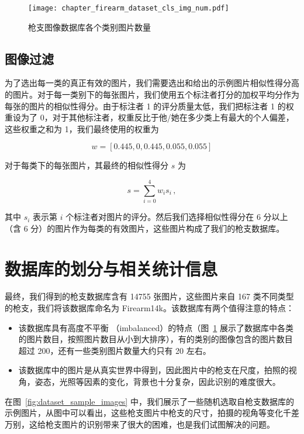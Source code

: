 \begin{figure}[t]
	\centering
	\texttt{[image: chapter\_firearm\_dataset\_cls\_img\_num.pdf]}
	\caption{枪支图像数据库各个类别图片数量}
	\label{fig:dataset_cls_img_num}
\end{figure}

\subsection{图像过滤}
为了选出每一类的真正有效的图片，我们需要选出和给出的示例图片相似性得分高的图片。对于每一类别下的每张图片，我们使用五个标注者打分的加权平均分作为每张的图片的相似性得分。由于标注者 1 的评分质量太低，我们把标注者 1 的权重设为了 0，对于其他标注者，权重反比于他/她在多少类上有最大的个人偏差，这些权重之和为 1，我们最终使用的权重为

 \[w = [0.445, 0, 0.445, 0.055, 0.055]\]

对于每类下的每张图片，其最终的相似性得分 $s$ 为

\begin{equation}
s = \sum_{i=0}^{4}w_{i}s_{i}\, ,
\end{equation}

其中 $s_i$ 表示第 $i$ 个标注者对图片的评分。然后我们选择相似性得分在 6 分以上（含 6 分）的图片作为每类的有效图片，这些图片构成了我们的枪支数据库。

\section{数据库的划分与相关统计信息}\label{sec:dataset_stats}


最终，我们得到的枪支数据库含有 14755 张图片，这些图片来自 167 类不同类型的枪支，我们将该数据库命名为 Firearm14k。该数据库有两个值得注意的特点：
\begin{itemize}
\item  该数据库具有高度不平衡 （imbalanced）的特点（图~\ref{fig:dataset_cls_img_num} 展示了数据库中各类的图片数目，按照图片数目从小到大排序），有的类别的图像包含的图片数目超过 200，还有一些类别图片数量大约只有 20 左右。
\item 该数据库中的图片是从真实世界中得到，因此图片中的枪支在尺度，拍照的视角，姿态，光照等因素的变化，背景也十分复杂，因此识别的难度很大。
\end{itemize}
在图~\ref{fig:dataset_sample_images} 中，我们展示了一些随机选取自枪支数据库的示例图片，从图中可以看出，这些枪支图片中枪支的尺寸，拍摄的视角等变化千差万别，这给枪支图片的识别带来了很大的困难，也是我们试图解决的问题。

